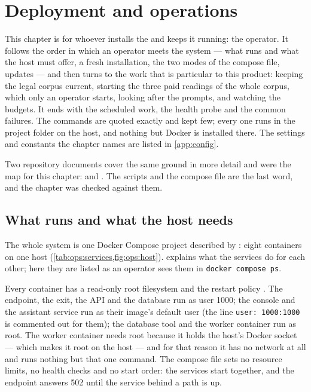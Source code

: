 \chapter{Deployment and operations}\label{ch:ops}

This chapter is for whoever installs the \product{} and keeps it running: the operator. It
follows the order in which an operator meets the system --- what runs and what the host must
offer, a fresh installation, the two modes of the compose file, updates --- and then
turns to the work that is particular to this product: keeping the legal corpus current,
starting the three paid readings of the whole corpus, which only an operator starts, looking after the
prompts, and watching the budgets. It ends with the scheduled work, the health probe and the
common failures. The commands are quoted exactly and kept few; every one runs in the project
folder on the host, and nothing but Docker is installed there. The settings and constants the
chapter names are listed in \cref{app:config}.

Two repository documents cover the same ground in more detail and were the map for this
chapter:  and . The scripts and the
compose file are the last word, and the chapter was checked against them.


\section{What runs and what the host needs}\label{sec:ops:runs}

The whole system is one Docker Compose project described by : eight
containers on one host (\cref{tab:ops:services,fig:ops:host}).  explains what the
services do for each other; here they are listed as an operator sees them in
\texttt{docker compose ps}.

Every container has a read-only root filesystem and the restart policy .
The endpoint, the exit, the API and the database run as user 1000; the console and the
assistant service run as their image's default user (the line \texttt{user: 1000:1000} is
commented out for them); the database tool and the worker container run as root. The worker
container needs root because it holds the host's Docker socket --- which makes it root on the
host --- and for that reason it has no network at all and runs nothing but that one command.
The compose file sets no resource limits, no health checks and no start order: the services
start together, and the endpoint answers 502 until the service behind a path is up.

